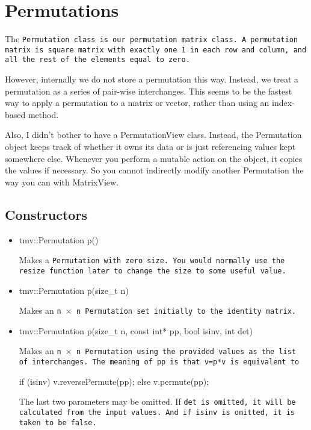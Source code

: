 
\section{Permutations}
\label{Permutation}

The \tt{Permutation} class is our permutation matrix class.
A permutation matrix is square matrix with exactly one 1 in each row and
column, and all the rest of the elements equal to zero.

However, internally we do not store a permutation this way.
Instead, we treat a permutation as a series of pair-wise interchanges.
This seems to be the fastest way to apply a permutation to a matrix or
vector, rather than using an index-based method.

Also, I didn't bother to have a PermutationView class.  Instead, the 
Permutation object keeps track of whether it owns its data or is just
referencing values kept somewhere else.  Whenever you perform 
a mutable action on the object, it copies the values if necessary.
So you cannot indirectly modify another Permutation the way you can
with MatrixView.

\subsection{Constructors}
\label{Permutation_Constructors}

\begin{itemize}

\item
\begin{tmvcode}
tmv::Permutation p()
\end{tmvcode}
Makes a \tt{Permutation} with zero size.  You would normally use the \tt{resize} function later to
change the size to some useful value.

\item 
\begin{tmvcode}
tmv::Permutation p(size_t n)
\end{tmvcode}
Makes an \tt{n} $\times$ \tt{n} \tt{Permutation} set initially to the identity matrix.

\item
\begin{tmvcode}
tmv::Permutation p(size_t n, const int* pp, bool isinv, int det)
\end{tmvcode}
Makes an \tt{n} $\times$ \tt{n} \tt{Permutation} using the provided values as the 
list of interchanges.  The meaning of pp is that \tt{v=p*v} is equivalent to
\begin{tmvcode}
if (isinv) v.reversePermute(pp);
else v.permute(pp);
\end{tmvcode}
The last two parameters may be omitted.  If \tt{det} is omitted, it will be calculated
from the input values.  And if \tt{isinv} is omitted, it is taken to be \tt{false}.

\end{itemize}


